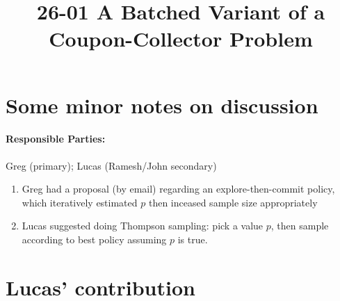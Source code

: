 \documentclass[11pt]{article}
\begin{document}
\title{26-01 A Batched Variant of a Coupon-Collector Problem}

\maketitle

\section{Some minor notes on discussion}

\paragraph{Responsible Parties:} Greg (primary); Lucas (Ramesh/John secondary)

\begin{enumerate}[1.]
\item Greg had a proposal (by email) regarding an explore-then-commit
  policy, which iteratively estimated $p$ then inceased sample size
  appropriately
\item Lucas suggested doing Thompson sampling: pick a value $p$,
  then sample according to best policy assuming $p$ is true.
\end{enumerate}

\section{Lucas' contribution}
\end{document}
